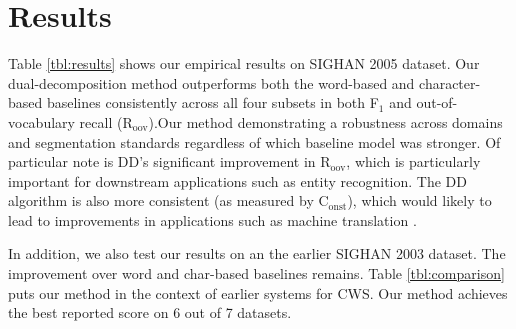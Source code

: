 \section{Results}

Table \ref{tbl:results} shows our empirical results on SIGHAN  2005 dataset. Our dual-decomposition method outperforms both the word-based and character-based baselines  consistently across all four subsets in both F$_1$ and out-of-vocabulary recall (R$_{\mathrm{oov}}$).Our method demonstrating a robustness across domains and segmentation standards regardless of which baseline model was stronger. Of particular note is DD's significant improvement in R$_{\mathrm{oov}}$, which is particularly important for downstream applications such as entity recognition. The DD algorithm is also more consistent (as measured by C$_{\mathrm{onst}}$), which would likely to lead to improvements in applications such as machine translation \cite{Chang:2008:ACL}. 

In addition, we also test our results on an the earlier SIGHAN 2003 dataset. The improvement over word and char-based baselines remains. 
Table \ref{tbl:comparison} puts our method in the context of earlier systems for CWS. Our method achieves the best reported score on 6 out of 7 datasets.
%


